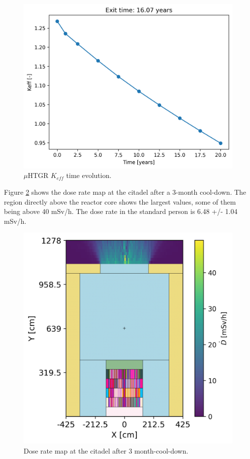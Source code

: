 \begin{figure}[htbp!]
  \begin{center}
    \includegraphics[width=0.55\linewidth]{figures/keff-irrad-time}
  \end{center}
  \caption{$\mu$HTGR $K_{eff}$ time evolution.}
  \label{fig:res-1}
\end{figure}

Figure \ref{fig:res-2} shows the dose rate map at the citadel after a 3-month cool-down.
The region directly above the reactor core shows the largest values, some of them being above 40 mSv/h.
The dose rate in the standard person is 6.48 +/- 1.04 mSv/h.

\begin{figure}[htbp!]
  \begin{center}
    \includegraphics[width=0.60\linewidth]{figures/meshtal4}
  \end{center}
  \caption{Dose rate map at the citadel after 3 month-cool-down.}
  \label{fig:res-2}
\end{figure}

